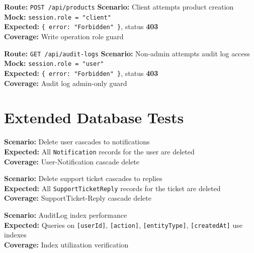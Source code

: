 ﻿\documentclass[12pt,a4paper]{report}
\newcommand{\pone}{\textbf{\color{p1red}P1}}
\newcommand{\ptwo}{\textbf{\color{p2orange}P2}}
\newcommand{\pthree}{\textbf{\color{p3blue}P3}}
\begin{document}
\begin{tcolorbox}[criticalbox,title={RBAC-007 \hfill \pone\ --- Client Cannot Create Products}]
\textbf{Route:} \texttt{POST /api/products} \quad \textbf{Scenario:} Client attempts product creation \\
\textbf{Mock:} \texttt{session.role = "client"} \\
\textbf{Expected:} \texttt{\{ error: "Forbidden" \}}, status \textbf{403} \\
\textbf{Coverage:} Write operation role guard
\end{tcolorbox}

\begin{tcolorbox}[criticalbox,title={RBAC-008 \hfill \pone\ --- Audit Log Access}]
\textbf{Route:} \texttt{GET /api/audit-logs} \quad \textbf{Scenario:} Non-admin attempts audit log access \\
\textbf{Mock:} \texttt{session.role = "user"} \\
\textbf{Expected:} \texttt{\{ error: "Forbidden" \}}, status \textbf{403} \\
\textbf{Coverage:} Audit log admin-only guard
\end{tcolorbox}

\section{Extended Database Tests}

\begin{tcolorbox}[testbox,title={DB-006 \hfill \ptwo}]
\textbf{Scenario:} Delete user cascades to notifications \\
\textbf{Expected:} All \texttt{Notification} records for the user are deleted \\
\textbf{Coverage:} User-Notification cascade delete
\end{tcolorbox}

\begin{tcolorbox}[testbox,title={DB-007 \hfill \ptwo}]
\textbf{Scenario:} Delete support ticket cascades to replies \\
\textbf{Expected:} All \texttt{SupportTicketReply} records for the ticket are deleted \\
\textbf{Coverage:} SupportTicket-Reply cascade delete
\end{tcolorbox}

\begin{tcolorbox}[testbox,title={DB-008 \hfill \pthree}]
\textbf{Scenario:} AuditLog index performance \\
\textbf{Expected:} Queries on \texttt{[userId]}, \texttt{[action]}, \texttt{[entityType]}, \texttt{[createdAt]} use indexes \\
\textbf{Coverage:} Index utilization verification
\end{tcolorbox}
\end{document}
